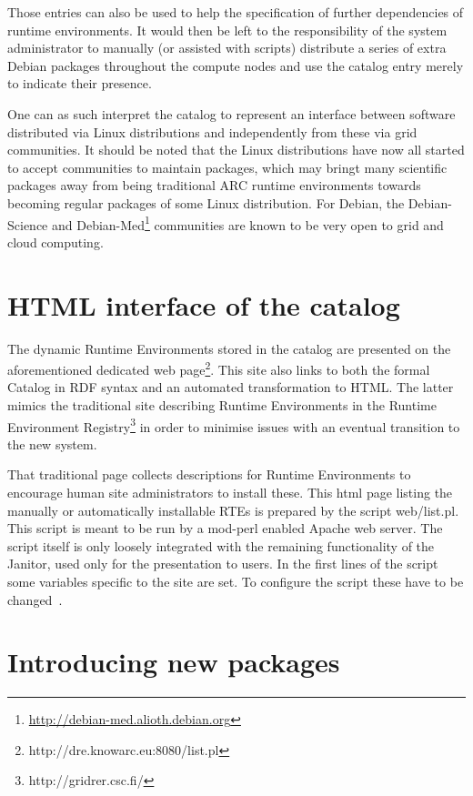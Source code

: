 Those entries can also be used to help the specification of further
dependencies of runtime environments. It would then be left to the
responsibility of the system administrator to manually (or assisted with
scripts) distribute a series of extra Debian packages throughout the
compute nodes and use the catalog entry merely to indicate their presence.

One can as such interpret the catalog to represent an interface between
software distributed via Linux distributions and independently from these
via grid communities. It should be noted that the Linux distributions
have now all started to accept communities to maintain packages, which
may bringt many scientific packages away from being traditional ARC 
runtime environments towards becoming regular packages of some Linux
distribution. For Debian, the Debian-Science and
Debian-Med\footnote{\href{http://debian-med.alioth.debian.org}{http://debian-med.alioth.debian.org}}
communities are known to be very open to grid and cloud computing.

\section{HTML interface of the catalog}

The dynamic Runtime Environments stored in the
catalog are presented on the aforementioned dedicated web
page\footnote{http://dre.knowarc.eu:8080/list.pl}. This site also
links to both the formal Catalog in RDF syntax and an automated
transformation to HTML. The latter mimics the traditional
site describing Runtime Environments in the Runtime Environment
Registry\footnote{http://gridrer.csc.fi/} in order to minimise issues
with an eventual transition to the new system.

That traditional page collects descriptions for Runtime Environments to
encourage human site administrators to install these.  This html page
listing the manually or automatically installable RTEs is prepared by
the script web/list.pl.  This script is meant to be run by a mod-perl
enabled Apache web server. The script itself is only loosely integrated
with the remaining functionality of the Janitor, used only for the
presentation to users. In the first lines of the script some variables
specific to the site are set. To configure the script these have to be
changed~\cite[p. 9]{BAYER_2007}.



\section{Introducing new packages}\label{sec:introducing_new_packages}

